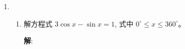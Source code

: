 \documentclass{report}
\newcommand{\sol}{\vspace{0.2cm}\textbf{解}:}
\begin{document}
\begin{enumerate}[leftmargin=*]
        \sol{}
        \begin{align*}
            \cos \theta + \sqrt{3} \sin \theta &= R\cos(\theta - \alpha) = R\cos\theta\cos\alpha + R\sin\theta\sin\alpha
        \end{align*}
        \begin{align*}
            \begin{cases}
                R\cos\alpha &= 1\ \cdots\ (1)\\
                R\sin\alpha &= \sqrt{3}\ \cdots\ (2)
            \end{cases}
        \end{align*}
        \begin{align*}
            (1)^2 + (2)^2 &\Rightarrow R^2(\cos^2\alpha + \sin^2\alpha) = 1 + 3\\
            R^2 &= 4\\
            R &= \pm 2\\
            \dfrac{(2)}{(1)} &\Rightarrow \tan\alpha = \sqrt{3}\\
            \alpha &= \dfrac{\pi}{3}
        \end{align*}
        \begin{align*}
            \cos \theta + \sqrt{3} \sin \theta &= \sqrt{2}\\
            \pm 2\cos\left(\theta - \dfrac{\pi}{3}\right) &= \sqrt{2}\\
            \cos\left(\theta - \dfrac{\pi}{3}\right) &= \pm \dfrac{\sqrt{2}}{2}\\
            \theta - \dfrac{\pi}{3} &= 2k\pi \pm \dfrac{\pi}{4}\\
            \theta &= 2k\pi + \dfrac{\pi}{3} \pm \dfrac{\pi}{4}\\
            \theta &= 2k\pi + \dfrac{7\pi}{12} \quad \text{or} \quad \theta = 2k\pi + \dfrac{\pi}{12} \quad \text{where } k \in \mathbb{Z} & \blacksquare
        \end{align*}
        
        
        \item \begin{enumerate}
            \item 解方程式 $3 \cos x-\sin x=1$, 式中 $0^{\circ} \leq x \leq 360^{\circ}$。
            
            \sol{}


\end{enumerate}
\end{enumerate}
\end{document}
